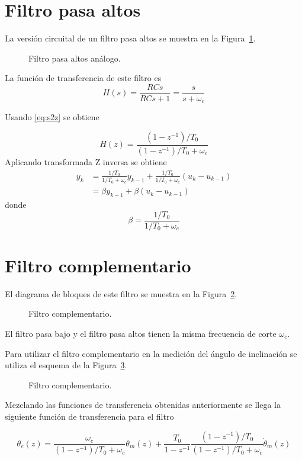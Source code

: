 \documentclass[11pt]{article} %
\begin{document}
\section{Filtro pasa altos}
La versión circuital de un filtro pasa altos se muestra en la Figura~\ref{fig:HPF}.

\begin{figure}[h!tb]
\centering

\caption{Filtro pasa altos análogo.}
\label{fig:HPF}
\end{figure}

La función de transferencia de este filtro es
\[ H(s) = \frac{RCs}{RCs+1} = \frac{s}{s+\omega_c} \]

Usando \eqref{eq:s2z} se obtiene

\[ H(z) = \frac{(1-z^{-1})/T_0}{(1-z^{-1})/T_0 + \omega_c} \]
Aplicando transformada Z inversa se obtiene
\begin{align*}
y_k &= \frac{1/T_0}{1/T_0+\omega_c} y_{k-1} + \frac{1/T_0}{1/T_0+\omega_c} (u_k-u_{k-1})  \\
	&= \beta y_{k-1} + \beta (u_k-u_{k-1})
\end{align*}
donde
\[ \beta = \frac{1/T_0}{1/T_0+\omega_c} \]

\section{Filtro complementario}
El diagrama de bloques de este filtro se muestra en la Figura~\ref{fig:CF}.

\begin{figure}[h!tb]
\centering

\caption{Filtro complementario.}
\label{fig:CF}
\end{figure}

El filtro pasa bajo y el filtro pasa altos tienen la misma 
frecuencia de corte \( \omega_c \).

Para utilizar el filtro complementario en la medición del 
ángulo de inclinación se utiliza el esquema de la 
Figura~\ref{fig:CFaccgyro}.

\begin{figure}[h!tb]
\centering

\caption{Filtro complementario.}
\label{fig:CFaccgyro}
\end{figure}

Mezclando las funciones de transferencia obtenidas 
 anteriormente se llega la siguiente función de transferencia 
para el filtro

\[ \theta_e(z) = \frac{\omega_c}{(1-z^{-1})/T_0 + \omega_c} \theta_m (z) + \frac{T_0}{1-z^{-1}} \frac{(1-z^{-1})/T_0}{(1-z^{-1})/T_0 + \omega_c} \dot{\theta}_m(z) \]
\end{document}
